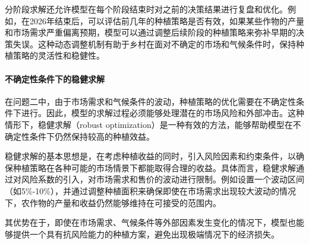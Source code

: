 \documentclass[12pt,a4paper]{nmmcm}
\begin{document}
分阶段求解还允许模型在每个阶段结束时对之前的决策结果进行复盘和优化。例如，在2026年结束后，可以评估前几年的种植策略是否有效，如果某些作物的产量和市场需求严重偏离预期，模型可以通过调整后续阶段的种植策略来弥补早期的决策失误。这种动态调整机制有助于乡村在面对不确定的市场和气候条件时，保持种植策略的灵活性和稳健性。

\paragraph{不确定性条件下的稳健求解}

在问题二中，由于市场需求和气候条件的波动，种植策略的优化需要在不确定性条件下进行。因此，模型的求解过程必须能够处理潜在的市场风险和外部冲击。这种情形下，稳健求解（robust optimization）是一种有效的方法，能够帮助模型在不确定性条件下仍然保持较高的种植效益。

稳健求解的基本思想是，在考虑种植收益的同时，引入风险因素和约束条件，以确保种植策略在各种可能的市场情景下都能取得合理的收益。具体而言，稳健求解通过对风险系数的引入，对市场需求和售价的波动进行限制。例如设置一个波动区间（如5\%-10\%），并通过调整种植面积来确保即使在市场需求出现较大波动的情况下，农作物的产量和收益仍然能够维持在可接受的范围内。



其优势在于，即使在市场需求、气候条件等外部因素发生变化的情况下，模型也能够提供一个具有抗风险能力的种植方案，避免出现极端情况下的经济损失。
\end{document}
